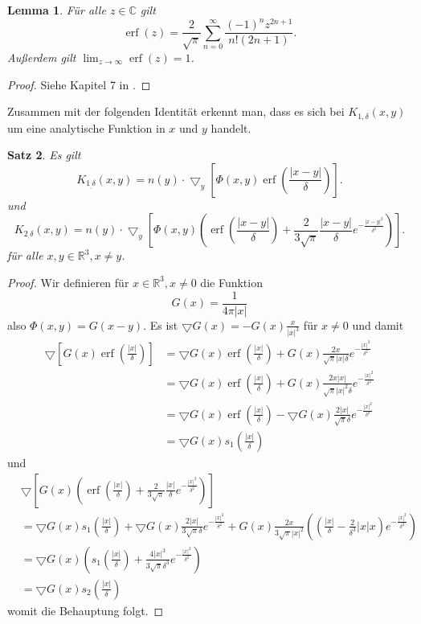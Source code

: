 \documentclass[12pt,a4paper]{scrartcl}
\newtheorem{Satz}{Satz}[section]
\newtheorem{Lemma}[Satz]{Lemma}
\numberwithin{equation}{section}
\newcommand{\C}{\mathbb{C}} %
\newcommand{\R}{\mathbb{R}} %
\newcommand{\grad}{\bigtriangledown}
\newcommand{\erf}{\operatorname{erf}}
\begin{document}
\begin{Lemma} \label{erfseries}
Für alle $z \in \C$ gilt
\[
\erf(z) = \frac{2}{\sqrt{\pi}}\sum_{n=0}^\infty \frac{(-1)^n z^{2 n +1}}{n!(2 n +1 )}.
\]
Außerdem gilt $\lim_{z \to \infty}\erf(z)=1$.
\end{Lemma}
\begin{proof}
Siehe Kapitel 7 in \cite{Stegun}.
\end{proof} 
Zusammen mit der folgenden Identität erkennt man, dass es sich bei $K_{1,\delta}(x,y)$ um eine analytische Funktion in $x$ und $y$ handelt.  
\begin{Satz} \label{k1ddef}
Es gilt
\begin{equation}
    K_{1_,\delta}(x,y) = n(y) \cdot \grad_y \left[ \Phi (x,y) \erf \left(\frac{|x-y|}{\delta}\right) \right]. \label{k1ddefeq}
\end{equation}
und
\begin{equation}
    K_{2_,\delta}(x,y) = n(y) \cdot \grad_y \left[ \Phi (x,y) (\erf \left(\frac{|x-y|}{\delta}\right) +\frac{2}{3\sqrt{\pi}}\frac{|x-y|}{\delta}e^{-\frac{|x-y|^2}{\delta^2}}) \right]. \label{k2ddefeq}
\end{equation}
für alle $x,y \in \R^3, x \neq y$.
\end{Satz}
\begin{proof}
Wir definieren für $x\in \R^3, x \neq 0$ die Funktion 
\[
G(x) = \frac{1}{4 \pi |x|}
\]
also $\Phi(x,y) = G(x-y)$. Es ist $ \grad G(x) = - G(x) \frac{x}{|x|^3}$ für $x \neq 0$ und damit
\begin{align*}
\grad \left[ G(x) \erf \left(\frac{|x|}{\delta}\right) \right] &= \grad G(x) \erf \left(\frac{|x|}{\delta}\right)+ G(x) \frac{2x}{\sqrt{\pi}|x| \delta}e^{-\frac{|x|^2}{\delta^2}} \\
&= \grad G(x) \erf \left(\frac{|x|}{\delta} \right)+ G(x) \frac{2x |x|}{\sqrt{\pi}|x|^2 \delta}e^{-\frac{|x|^2}{\delta^2}}\\
&=\grad G(x) \erf \left(\frac{|x|}{\delta}\right) - \grad G(x) \frac{2 |x|}{\sqrt{\pi} \delta}e^{-\frac{|x|^2}{\delta^2}} \\
&= \grad G(x)s_1 \left( \frac{|x|}{\delta}  \right)
\end{align*}
und
\begin{align*}
&\grad \left[ G(x) \left(\erf \left(\frac{|x|}{\delta}\right) +\frac{2}{3\sqrt{\pi}}\frac{|x|}{\delta}e^{-\frac{|x|^2}{\delta^2}} \right) \right] \\
&= \grad G(x)s_1 \left( \frac{|x|}{\delta}  \right)+ \grad G(x) \frac{2 |x|}{3 \sqrt{\pi}\delta}e^{-\frac{|x|^2}{\delta^2}} +G(x)\frac{2 x}{3 \sqrt{\pi} |x|^2} \left( \left( \frac{|x|}{\delta} -\frac{2}{\delta^3} |x| x \right) e^{-\frac{|x|^2}{\delta^2}} \right) \\
&= \grad G(x) \left( s_1  \left(\frac{|x|}{\delta} \right) +\frac{4 |x|^3}{3 \sqrt{\pi} \delta^3}e^{-\frac{|x|^2}{\delta^2}} \right) \\
&= \grad G(x) s_2 \left(\frac{|x|}{\delta} \right)
\end{align*}
womit die Behauptung folgt.
\end{proof}
\end{document}
